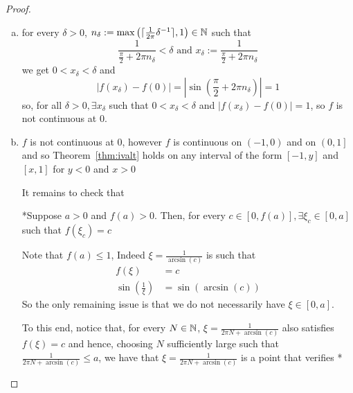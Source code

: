 \begin{proof}\text{ }
    \begin{enumerate}[(a)]
        \item for every $\delta > 0$, $n_\delta := \max\left(\lceil\frac{1}{2\pi}\delta^{-1}\rceil, 1\right)\in \mathbb N$ such that 
        $$\frac{1}{\frac{\pi}{2} + 2\pi n_\delta} < \delta\text{ and }x_\delta := \frac{1}{\frac{\pi}{2} + 2\pi n_\delta}$$
        we get $0 < x_\delta < \delta$ and 
        $$|f(x_\delta) - f(0)| = |\sin(\frac{\pi}{2} + 2\pi n_\delta)| = 1$$
        so, for all $\delta > 0, \exists x_\delta$ such that $0 < x_\delta < \delta$ and
        $|f(x_\delta) - f(0)| = 1$, so $f$ is not continuous at $0$.
        \item $f$ is not continuous at $0$, however $f$ is continuous on $(-1, 0)$ and on $\left(0, 1\right]$ and 
        so Theorem~\ref{thm:ivalt} holds on any interval of the form $\left[-1, y\right]$ and $\left[ x, 1\right]$ for 
        $y < 0$ and $x > 0$

        It remains to check that 

        *Suppose $a > 0$ and $f(a) > 0$. Then, for every $c \in \left[0, f(a)\right], \exists \xi_c\in\left[0, a\right]$ such that 
        $f(\xi_c) = c$

        Note that $f(a) \leq 1$, Indeed $\xi = \frac{1}{\arcsin(c)}$ is such that 
        \begin{align*}
            f(\xi) &= c \\
            \sin\left(\frac{1}{\xi}\right) &= \sin(\arcsin(c))
        \end{align*}
        So the only remaining issue is that we do not necessarily have $\xi \in \left[0, a\right]$.

        To this end, notice that, for every $N \in \mathbb N$, $\xi = \frac{1}{2\pi N + \arcsin(c)}$ 
        also satisfies $f(\xi) = c$ and hence, choosing $N$ sufficiently large such that $\frac{1}{2\pi N + \arcsin(c)} \leq a$, 
        we have that $\xi = \frac{1}{2\pi N + \arcsin(c)}$ is a point that verifies *
    \end{enumerate}
\end{proof}

